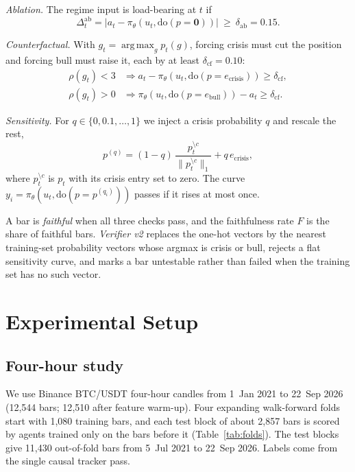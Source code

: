\documentclass[conference]{IEEEtran}
\DeclareMathOperator*{\argmax}{arg\,max}
\begin{document}
\emph{Ablation.} The regime input is load-bearing at $t$ if
\begin{equation}
\Delta^{\text{ab}}_t=\bigl\lvert a_t-\pi_\theta(u_t,\mathrm{do}(p{=}\mathbf 0))\bigr\rvert\ \ge\ \delta_{\text{ab}}=0.15 .
\end{equation}

\emph{Counterfactual.} With $g_t=\argmax_g p_t(g)$, forcing crisis must cut the position and forcing bull must raise it, each by at least $\delta_{\text{cf}}=0.10$:
\begin{align}
\rho(g_t)<3 &\Rightarrow a_t-\pi_\theta(u_t,\mathrm{do}(p{=}e_{\text{crisis}}))\ge\delta_{\text{cf}},\\
\rho(g_t)>0 &\Rightarrow \pi_\theta(u_t,\mathrm{do}(p{=}e_{\text{bull}}))-a_t\ge\delta_{\text{cf}}.
\end{align}

\emph{Sensitivity.} For $q\in\{0,0.1,\dots,1\}$ we inject a crisis probability $q$ and rescale the rest,
\begin{equation}
p^{(q)}=(1-q)\,\frac{p_t^{\setminus c}}{\lVert p_t^{\setminus c}\rVert_1}+q\,e_{\text{crisis}},
\end{equation}
where $p_t^{\setminus c}$ is $p_t$ with its crisis entry set to zero. The curve $y_i=\pi_\theta(u_t,\mathrm{do}(p{=}p^{(q_i)}))$ passes if it rises at most once.

A bar is \emph{faithful} when all three checks pass, and the faithfulness rate $F$ is the share of faithful bars. \emph{Verifier v2} replaces the one-hot vectors by the nearest training-set probability vectors whose argmax is crisis or bull, rejects a flat sensitivity curve, and marks a bar untestable rather than failed when the training set has no such vector.

\section{Experimental Setup}
\subsection{Four-hour study}
We use Binance BTC/USDT four-hour candles from 1~Jan 2021 to 22~Sep 2026 (12{,}544 bars; 12{,}510 after feature warm-up). Four expanding walk-forward folds start with 1{,}080 training bars, and each test block of about 2{,}857 bars is scored by agents trained only on the bars before it (Table~\ref{tab:folds}). The test blocks give 11{,}430 out-of-fold bars from 5~Jul 2021 to 22~Sep 2026. Labels come from the single causal tracker pass.
\end{document}
